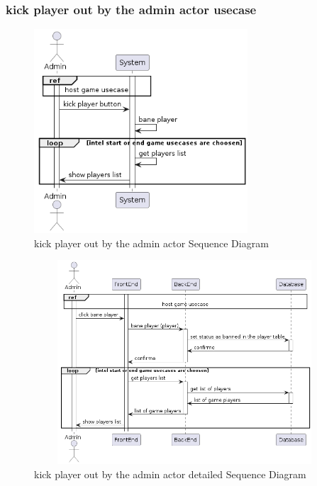 \documentclass{article}
\begin{document}
\subsubsection{kick player out by the admin actor usecase}
\begin{figure}[H]
	\centering
	\includegraphics[height=3in]{../thesis_tex/assets/diagrams/kick_player_out_SD.png}
	\caption{kick player out by the admin actor Sequence Diagram}
\end{figure}

\begin{figure}[H]
	\centering
	\includegraphics[height=3in,width=6in]{../thesis_tex/assets/diagrams/kick_player_out_detailedSD.png}
	\caption{kick player out by the admin actor detailed Sequence Diagram}
\end{figure}
\end{document}
